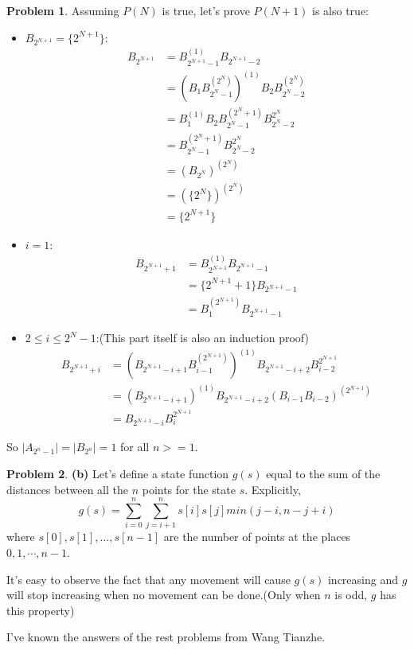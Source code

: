 \documentclass[12pt]{article}
\providecommand{\abs}[1]{\lvert#1\rvert}
\theoremstyle{definition}
\newtheorem{hw}{Problem}
\begin{document}
\begin{hw}
		Assuming $P(N)$ is true, let's prove $P(N+1)$ is also true:
		\begin{itemize}
			\item $B_{2^{N+1}} = \{2^{N+1}\}$: 
				\[ \begin{split}
				B_{2^{N+1}} & = B_{2^{N+1}-1}^{(1)}B_{2^{N+1}-2} \\
							& = (B_1B_{2^N-1}^{(2^N)})^{(1)}B_2B_{2^N-2}^{(2^N)} \\
							& = B_1^{(1)}B_2B_{2^N-1}^{(2^N+1)}B_{2^N-2}^{2^N} \\
							& = B_{2^N-1}^{(2^N+1)}B_{2^N-2}^{2^N} \\
							& = (B_{2^N})^{(2^N)} \\
							& = (\{2^N\})^{(2^N)} \\
							& = \{2^{N+1}\}
				\end{split} \]
			\item $i = 1$:
				\[ \begin{split}
				B_{2^{N+1}+1} & = B_{2^{N+1}}^{(1)}B_{2^{N+1}-1} \\
							  & = \{2^{N+1} + 1\}B_{2^{N+1}-1} \\
							  & = B_{1}^{(2^{N+1})}B_{2^{N+1}-1}
				\end{split} \]
			\item $2 \leq i \leq 2^N - 1$:(This part itself is also an induction proof)
				 \[ \begin{split}
					 B_{2^{N+1}+i} 
					 & = (B_{2^{N+1}-i+1}B_{i-1}^{(2^{N+1})})^{(1)}B_{2^{N+1}-i+2}B_{i-2}^{2^{N+1}}  \\
					 & = (B_{2^{N+1}-i+1})^{(1)}B_{2^{N+1}-i+2}(B_{i-1}B_{i-2})^{(2^{N+1})} \\
					 & = B_{2^{N+1}-i}B_{i}^{2^{N+1}}
				 \end{split} \]
		\end{itemize}
		So $\abs{A_{2^n-1}} = \abs{B_{2^n}} = 1$ for all $n >= 1$.
	\end{hw}
	
	\begin{hw}
		\textbf{(b)}
			Let's define a state function $g(s)$ equal to the sum of the distances between all the $n$ points for the state $s$. Explicitly, 
			$$
				g(s) = \sum_{i = 0}^{n}\sum_{j = i + 1}^{n}s[i]s[j]min(j - i, n - j + i)
			$$ 
			where $s[0], s[1], \dots, s[n-1]$ are the number of points at the places $0, 1, \cdots, n - 1$.
			
			It's easy to observe the fact that any movement will cause $g(s)$ increasing and $g$ will stop increasing when no movement can be done.(Only when $n$ is odd, $g$ has this property)
	\end{hw}
	
	\bigskip
	
	\bigskip
	
	\bigskip 
	
	I've known the answers of the rest problems from Wang Tianzhe. 
	
\end{document}
